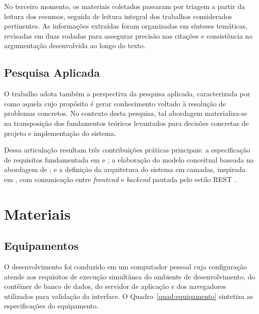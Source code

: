 No terceiro momento, os materiais coletados passaram por triagem a partir da leitura dos resumos, seguida de leitura integral dos trabalhos considerados pertinentes. As informações extraídas foram organizadas em sínteses temáticas, revisadas em duas rodadas para assegurar precisão nas citações e consistência na argumentação desenvolvida ao longo do texto.

\subsection{Pesquisa Aplicada}

O trabalho adota também a perspectiva da pesquisa aplicada, caracterizada por \cite{gerhardt2009} como aquela cujo propósito é gerar conhecimento voltado à resolução de problemas concretos. No contexto desta pesquisa, tal abordagem materializa-se na transposição dos fundamentos teóricos levantados para decisões concretas de projeto e implementação do sistema.

Dessa articulação resultam três contribuições práticas principais: a especificação de requisitos fundamentada em \cite{Sommerville2011} e \cite{PressmanMaxim2016}; a elaboração do modelo conceitual baseada na abordagem de \cite{Larman2007}; e a definição da arquitetura do sistema em camadas, inspirada em \cite{Fowler2002}, com comunicação entre \textit{frontend} e \textit{backend} pautada pelo estilo REST \cite{Fielding2000}.

\section{Materiais}
\label{sec:materiais}

\subsection{Equipamentos}

O desenvolvimento foi conduzido em um computador pessoal cuja configuração atende aos requisitos de execução simultânea do ambiente de desenvolvimento, do contêiner de banco de dados, do servidor de aplicação e dos navegadores utilizados para validação da interface. O Quadro~\ref{quad:equipamento} sintetiza as especificações do equipamento.

